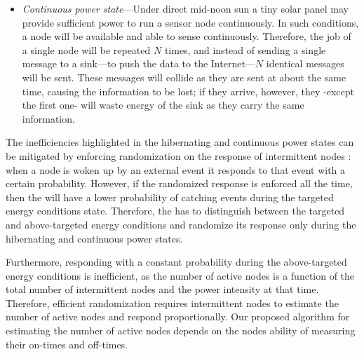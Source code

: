 \begin{itemize}[leftmargin=*]
	\item \label{it:continuous} \textit{Continuous power state}---Under direct mid-noon sun a tiny solar panel may provide sufficient power to run a sensor node continuously. In such conditions, a \cis node will be available and able to sense continuously. Therefore, the job of a single node will be repeated $N$ times, and instead of sending a single message to a sink---to push the data to the Internet---$N$ identical messages will be sent.
	These messages will collide as they are sent at about the same time, causing the information to be lost; if they arrive, however, they -except the first one- will waste energy of the sink as they carry the same information.  
				
\end{itemize}
%
The inefficiencies highlighted in the hibernating and continuous power states can be mitigated by enforcing randomization on the response of intermittent nodes 
: when a node is woken up by an external event it responds to that event with a certain probability. However, if the randomized response is enforced all the time, then the \cis will have a lower probability of catching events during the targeted energy conditions state. Therefore, the \cis has to distinguish between the targeted and above-targeted energy conditions and randomize its response only during the hibernating and continuous power states. 

Furthermore, responding with a constant probability during the above-targeted energy conditions is inefficient, as the number of active nodes is a function of the total number of intermittent nodes and the power intensity at that time. Therefore, efficient randomization requires intermittent nodes to estimate the number of active nodes and respond proportionally. Our proposed algorithm for estimating the number of active nodes depends on the nodes ability of measuring their on-times and off-times.

